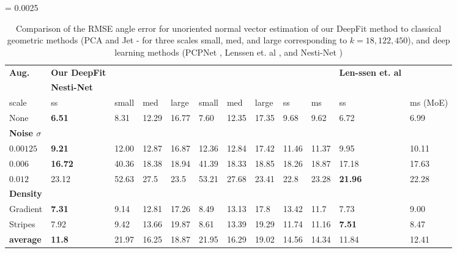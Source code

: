 \begin{table*} 
	\centering	
		\tabcolsep = 0.0025\textwidth
		\begin{tabular}{| M{0.12\textwidth} | M{0.10\textwidth} | M{0.06\textwidth} | M{0.06\textwidth}| M{0.06\textwidth} | M{0.06\textwidth}|
		M{0.06\textwidth}| M{0.06\textwidth} | M{0.06\textwidth}|  M{0.07\textwidth} | M{0.08\textwidth} | M{0.12\textwidth} |} 
			\hline
			\centering\textbf{Aug.}  & \centering\textbf{Our DeepFit}  &   &
			 & 	 & \centering\textbf{Len-ssen et. al} \\ \cite{lenssen2019differentiable} & \centering\textbf{Nesti-Net}
 			\tabularnewline
 			\hline
 			scale &ss&small&med&large&small&med&large&ss&ms&ss&ms (MoE)\\
 		    None               &\textbf{6.51}&8.31&12.29&16.77&7.60&12.35&17.35&9.68&9.62&6.72&6.99\\
 		    \hline
 			\textbf{Noise $\sigma$}     &&&&&&&&&&& \\
 			$0.00125$ &\textbf{9.21}&12.00&12.87&16.87&12.36&12.84&17.42&11.46&11.37&9.95&10.11\\
 			$0.006$   &\textbf{16.72}&40.36&18.38&18.94&41.39&18.33&18.85&18.26&18.87&17.18&17.63\\
 			$0.012$   &23.12&52.63&27.5 &23.5 &53.21&27.68&23.41&22.8&23.28&\textbf{21.96}&22.28\\
		    \hline
		    \textbf{Density}   &&&&&&&&&&& \\
		    Gradient           &\textbf{7.31}&9.14&12.81&17.26&8.49&13.13&17.8&13.42&11.7 &7.73&9.00\\
		    Stripes            &7.92&9.42&13.66&19.87&8.61&13.39&19.29&11.74&11.16&\textbf{7.51}&8.47\\
		    \hline
		    \textbf{average}   &\textbf{11.8}&21.97&16.25&18.87&21.95&16.29&19.02&14.56&14.34&11.84&12.41 \\
		    \hline
		\end{tabular}
	\caption{Comparison of the RMSE angle error for unoriented normal vector estimation of our DeepFit method to classical geometric methods (PCA \cite{hoppe1992surface} and Jet \cite{cazals2005estimating} - for three scales small, med, and large corresponding to $k=18, 122, 450$), and deep learning methods (PCPNet \cite{guerrero2018pcpnet}, Lenssen et. al \cite{lenssen2019differentiable}, and Nesti-Net \cite{ben2019nesti})}
	\label{table:results:baselines}
\end{table*} 


